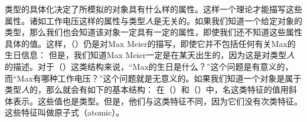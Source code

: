 类型的具体化决定了所模拟的对象具有什么样的属性。这样一个理论才能描写这些属性。诸如\textsc{工作电压}这样的属性与类型\textit{人}是无关的。如果我们知道一个给定对象的类型，那么我们也会知道该对象一定具有一定的属性，即使我们还不知道这些属性具体的值。这样，（）仍是对Max Meier的描写，即使它并不包括任何有关Max的生日信息：
\ea
{}
\z
但是，我们知道Max Meier一定是在某天出生的，因为这是对类型\textit{人}的描述。对于（）这类结构来说，“Max的生日是什么？”这个问题是有意义的，而“Max有哪种工作电压？”这个问题就是无意义的。如果我们知道一个对象是属于类型\textit{人}的，那么就会有如下的基本结构：
\ea
{}
\z
在（）和（）中，\textsc{名}这类特征的值用斜体表示。这些值也是类型。但是，他们与这类特征不同，因为它们没有次类特征。这些特征叫做原子式（atomic）。

